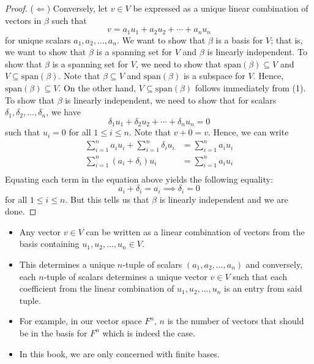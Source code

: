 \begin{proof}
(\( \Leftarrow \)) Conversely, let \( v \in V  \) be expressed as a unique linear combination of vectors in \( \beta \) such that 
\[  v = a_{1} u_{1} + a_{2} u_{2} + \cdots + a_{n} u_{n} \tag{1}  \]
for unique scalars \( a_{1}, a_{2}, \dots , a_{n}  \). We want to show that \( \beta   \) is a basis for \( V  \); that is, we want to show that \( \beta \) is a spanning set for \( V  \) and \( \beta \) is linearly independent. To show that \( \beta \) is a spanning set for \( V  \), we need to show that \( \text{span}(\beta) \subseteq V  \) and \( V \subseteq \text{span}(\beta) \). Note that \( \beta \subseteq V  \) and \( \text{span}(\beta) \) is a subspace for \( V  \). Hence, \( \text{span}(\beta) \subseteq V  \). On the other hand, \( V \subseteq \text{span}(\beta) \) follows immediately from (1). To show that \( \beta \) is linearly independent, we need to show that for scalars \( \delta_{1}, \delta_{2}, \dots, \delta_{n}  \), we have
\[ \delta_{1} u_{1} + \delta_{2}u_{2} + \cdots + \delta_{n} u_{n} = 0   \] such that  \( u_{i} = 0   \) for all \( 1 \leq i \leq n \). Note that \( v + 0 = v  \). Hence, we can write
\begin{align*}
    \sum_{ i=1 }^{ n } a_{i} u_{i}  + \sum_{ i=1 }^{ n } \delta_{i} u_{i}    &=  \sum_{ i=1 }^{ n } a_{i} u_{i} \\
    \sum_{ i=1 }^{ n } (a_{i} + \delta_{i}) u_{i} &= \sum_{ i=1 }^{ n } a_{i} u_{i} \\
\end{align*} Equating each term in the equation above yields the following equality:
\[ a_{i} + \delta_{i} = a_{i} \implies \delta_{i} = 0    \]
for all \( 1 \leq  i \leq n  \). But this tells us that \( \beta \) is linearly independent and we are done.
\end{proof}

\begin{itemize}
    \item Any vector \(  v \in V  \) can be written as a linear combination of vectors from the basis containing \( u_{1}, u_{2}, \dots, u_{n} \in V  \). 
    \item This determines a unique \( n  \)-tuple of scalars \( (a_{1}, a_{2}, \dots, a_{n}) \) and conversely, each \( n \)-tuple of scalars determines  a unique vector \( v \in V   \) such that each coefficient from the linear combination of \( u_{1}, u_{2}, \dots, u_{n}  \) is an entry from said tuple.
    \item For example, in our vector space \( F^{n} \), \( n  \) is the number of vectors that should be in the basis for \( F^{n} \) which is indeed the case.
    \item In this book, we are only concerned with finite bases.
\end{itemize}

